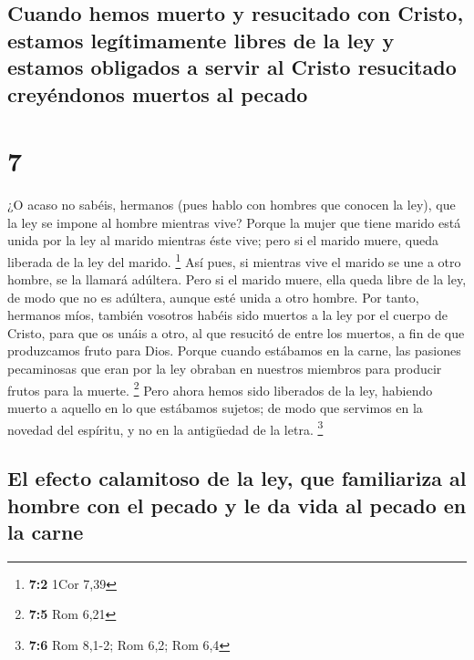 \begin{paracol}{2}
{\subsection{Cuando hemos muerto y resucitado con Cristo, estamos
legítimamente libres de la ley y estamos obligados a servir al Cristo
resucitado creyéndonos muertos al
pecado}\label{cuando-hemos-muerto-y-resucitado-con-cristo-estamos-leguxedtimamente-libres-de-la-ley-y-estamos-obligados-a-servir-al-cristo-resucitado-creyuxe9ndonos-muertos-al-pecado}}

\hypertarget{section-12}{%
\section{7}\label{section-12}}

 ¿O acaso no sabéis, hermanos (pues hablo con hombres que
conocen la ley), que la ley se impone al hombre mientras vive?
 Porque la mujer que tiene marido está unida por la ley al
marido mientras éste vive; pero si el marido muere, queda liberada de la
ley del marido. \footnote{\textbf{7:2} 1Cor 7,39}  Así
pues, si mientras vive el marido se une a otro hombre, se la llamará
adúltera. Pero si el marido muere, ella queda libre de la ley, de modo
que no es adúltera, aunque esté unida a otro hombre.  Por
tanto, hermanos míos, también vosotros habéis sido muertos a la ley por
el cuerpo de Cristo, para que os unáis a otro, al que resucitó de entre
los muertos, a fin de que produzcamos fruto para Dios. 
Porque cuando estábamos en la carne, las pasiones pecaminosas que eran
por la ley obraban en nuestros miembros para producir frutos para la
muerte. \footnote{\textbf{7:5} Rom 6,21}  Pero ahora hemos
sido liberados de la ley, habiendo muerto a aquello en lo que estábamos
sujetos; de modo que servimos en la novedad del espíritu, y no en la
antigüedad de la letra. \footnote{\textbf{7:6} Rom 8,1-2; Rom 6,2; Rom
  6,4}

\hypertarget{el-efecto-calamitoso-de-la-ley-que-familiariza-al-hombre-con-el-pecado-y-le-da-vida-al-pecado-en-la-carne}{%
\subsection{El efecto calamitoso de la ley, que familiariza al hombre
con el pecado y le da vida al pecado en la
carne}\label{el-efecto-calamitoso-de-la-ley-que-familiariza-al-hombre-con-el-pecado-y-le-da-vida-al-pecado-en-la-carne}}


\end{paracol}
